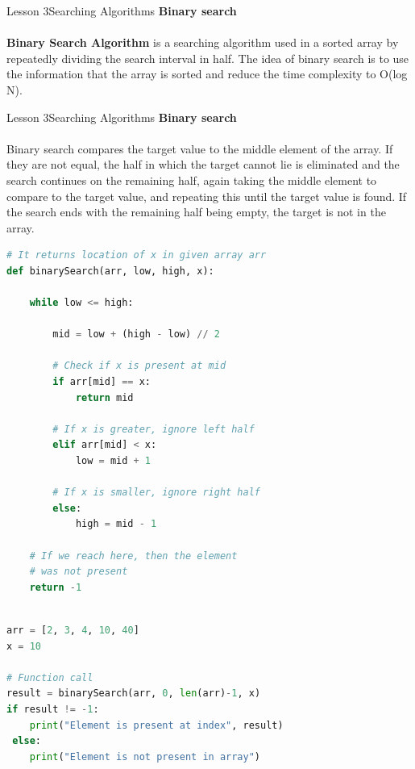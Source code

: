 \documentclass[aspectratio=1610]{beamer}
\begin{document}
\begin{frame}{Lesson 3}{Searching Algorithms}
\LARGE
\textbf{Binary search}\\~\\
\textbf{Binary Search Algorithm} is a searching algorithm used in a sorted array by
repeatedly dividing the search interval in half. The idea of binary search is to use the
information that the array is sorted and reduce the time complexity to O(log N). 
\end{frame}


\begin{frame}{Lesson 3}{Searching Algorithms}
\LARGE
\textbf{Binary search}\\~\\
Binary search compares the target value to the middle element of the array. If they are not equal, the half in which the target cannot lie is eliminated and the search continues on the remaining half, again taking the middle element to compare to the target value, and repeating this until the target value is found. If the search ends with the remaining half being empty, the target is not in the array.
\end{frame}

\begin{frame}[fragile]
\begin{lstlisting}[language=Python]
# It returns location of x in given array arr
def binarySearch(arr, low, high, x):

    while low <= high:

        mid = low + (high - low) // 2

        # Check if x is present at mid
        if arr[mid] == x:
            return mid

        # If x is greater, ignore left half
        elif arr[mid] < x:
            low = mid + 1

        # If x is smaller, ignore right half
        else:
            high = mid - 1

    # If we reach here, then the element
    # was not present
    return -1
\end{lstlisting}
\end{frame}


\begin{frame}[fragile]
\begin{lstlisting}[language=Python]

arr = [2, 3, 4, 10, 40]
x = 10

# Function call
result = binarySearch(arr, 0, len(arr)-1, x)
if result != -1:
    print("Element is present at index", result)
 else:
    print("Element is not present in array")
\end{lstlisting}
\end{frame}
\end{document}
